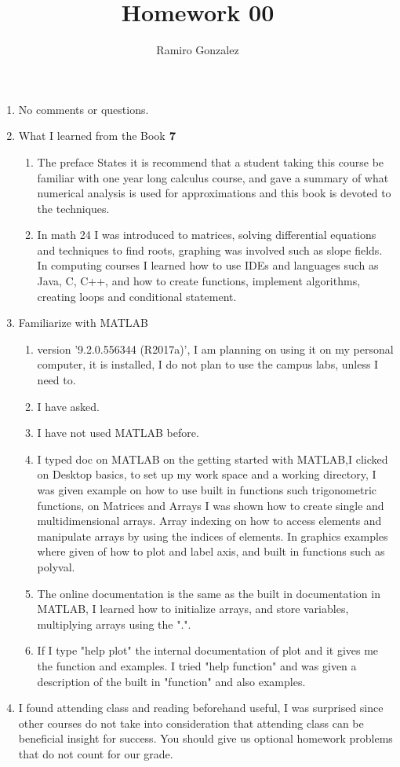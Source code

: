 \documentclass{article}
\title{Homework 00}
\author{Ramiro Gonzalez }
\date{}
\begin{document}
\maketitle
\begin{enumerate}
    \item No comments or questions. 
    \item What I learned from the Book
    $\bf{7}$
    \begin{enumerate}
        \item The preface States it is recommend that a student taking this course be familiar with one year long calculus course, and gave a summary of what numerical analysis is used for approximations and this book is devoted to the techniques. 
        \item In math 24 I was introduced to matrices, solving differential equations and techniques to find roots, graphing was involved such as slope fields. In computing courses I learned how to use IDEs and languages such as Java, C, C++, and how to create functions, implement algorithms, creating loops and conditional statement. 
    \end{enumerate}
    \item Familiarize with MATLAB
    \begin{enumerate}
        \item version '9.2.0.556344 (R2017a)', I am planning on using it on my personal  computer, it is installed, I do not plan to use the campus labs, unless I need to. 
        \item I have asked. 
        \item I have not used MATLAB before. 
        \item I typed doc on MATLAB on the getting started with MATLAB,I clicked on Desktop basics, to set up my work space and a working directory, I was given example on how to use built in functions such trigonometric functions, on Matrices and Arrays I was shown how to create single and multidimensional arrays. Array indexing on how to access elements and manipulate arrays by using the indices of elements. In graphics examples where given of how to plot and label axis, and built in functions such as polyval. 
        \item The online documentation is the same as the built in documentation in MATLAB, I learned how to initialize arrays, and store variables, multiplying arrays using the ".".
        \item If I type "help plot" the internal documentation of plot and it gives me the function and examples. I tried "help function" and was given a description of the built in "function" and also examples. 
    \end{enumerate}
    \item I found attending class and reading beforehand useful, I was surprised since other courses do not take into consideration that attending class can be beneficial insight for success. You should give us optional homework problems that do not count for our grade. 
\end{enumerate}
\end{document}
